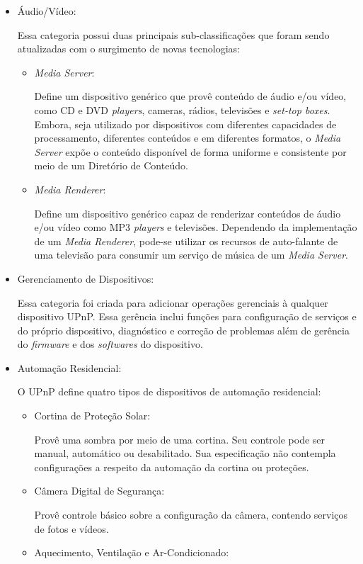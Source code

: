 \begin{itemize}
\item Áudio/Vídeo:

	Essa categoria possui duas principais sub-classificações que foram sendo atualizadas com o surgimento de novas tecnologias: 
	\begin{itemize}
		\item \emph{Media Server}:

			Define um dispositivo genérico que provê conteúdo de áudio e/ou vídeo, como CD e DVD \emph{players}, cameras, rádios, televisões e \emph{set-top boxes}. Embora, seja utilizado por dispositivos com diferentes capacidades de processamento, diferentes conteúdos e em diferentes formatos, o \emph{Media Server} expõe o conteúdo disponível de forma uniforme e consistente por meio de um Diretório de Conteúdo.

		\item \emph{Media Renderer}:

			Define um dispositivo genérico capaz de renderizar conteúdos de áudio e/ou vídeo como MP3 \emph{players} e televisões. Dependendo da implementação de um \emph{Media Renderer}, pode-se utilizar os recursos de auto-falante de uma televisão para consumir um serviço de música de um \emph{Media Server}.
	\end{itemize}
\item Gerenciamento de Dispositivos:

	Essa categoria foi criada para adicionar operações gerenciais à qualquer dispositivo UPnP. Essa gerência inclui funções para configuração de serviços e do próprio dispositivo, diagnóstico e correção de problemas além de gerência do \emph{firmware} e dos \emph{softwares} do dispositivo.

\item Automação Residencial:

	O UPnP define quatro tipos de dispositivos de automação residencial:
	\begin{itemize}
		\item Cortina de Proteção Solar:

			Provê uma sombra por meio de uma cortina. Seu controle pode ser manual, automático ou desabilitado. Sua especificação não contempla configurações a respeito da automação da cortina ou proteções.
		\item Câmera Digital de Segurança:

			Provê controle básico sobre a configuração da câmera, contendo serviços de fotos e vídeos.
		\item Aquecimento, Ventilação e Ar-Condicionado:
			

\end{itemize}
\end{itemize}
